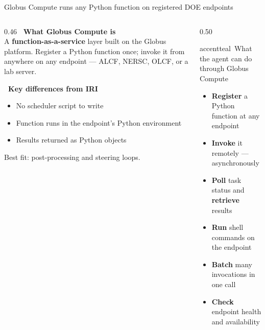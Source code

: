 \documentclass[aspectratio=169,11pt]{beamer}
\begin{document}
\begin{frame}{Globus Compute runs any Python function on registered DOE endpoints}
  \begin{columns}[t]
    \begin{column}{0.46\textwidth}
      \small
      {\bfseries\color{accentteal}\faGlobe\ What Globus Compute is}\\[4pt]
      A \textbf{function-as-a-service} layer built on the Globus platform.
      Register a Python function once; invoke it from anywhere on any
      endpoint — ALCF, NERSC, OLCF, or a lab server.

      \vspace{7pt}
      {\bfseries\color{accentteal}\faProjectDiagram\ Key differences from IRI}
      \begin{itemize}\setlength\itemsep{1pt}
        \item No scheduler script to write
        \item Function runs in the endpoint's Python environment
        \item Results returned as Python objects
      \end{itemize}
      \vspace{5pt}
      {\footnotesize\color{midgray}
        Best fit: post-processing and steering loops.}
    \end{column}
    \begin{column}{0.50\textwidth}
      \begin{featbox}{accentteal}{\faGlobe\ What the agent can do through Globus Compute}
        \footnotesize
        \begin{itemize}\setlength\itemsep{2pt}
          \item[\faCode] \textbf{Register} a Python function at any endpoint
          \item[\faRocket] \textbf{Invoke} it remotely — asynchronously
          \item[\faSync] \textbf{Poll} task status and \textbf{retrieve} results
          \item[\faNetworkWired] \textbf{Run} shell commands on the endpoint
          \item[\faTasks] \textbf{Batch} many invocations in one call
          \item[\faServer] \textbf{Check} endpoint health and availability
        \end{itemize}
      \end{featbox}
    \end{column}
  \end{columns}
\end{frame}
\end{document}
